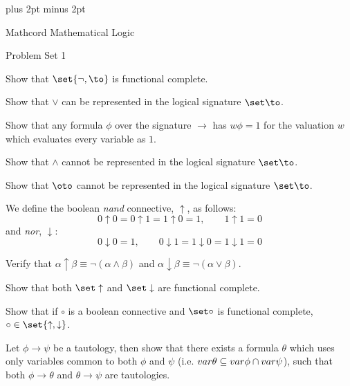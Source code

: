 

\parindent=0pt
\parskip=3pt plus 2pt minus 2pt



\centerline{Mathcord Mathematical Logic}
\centerline{Problem Set 1}

\bprob

    \benum
        \item Show that $\set{\neg,\to}$ is functional complete.
        \item Show that $\lor$ can be represented in the logical signature $\set\to$.
        \item Show that any formula $\phi$ over the signature $\to$ has $w\phi=1$ for the
        valuation $w$ which evaluates every variable as $1$.
        \item Show that $\land$ cannot be represented in the logical signature $\set\to$.
        \item Show that $\oto$ cannot be represented in the logical signature $\set\to$.
    \eenum

\eprob

\bprob

    We define the boolean {\it nand} connective, $\uparrow$, as follows:
    $$ 0\uparrow0 = 0\uparrow1 = 1\uparrow0 = 1,\qquad 1\uparrow1 = 0 $$
    and {\it nor}, $\downarrow$:
    $$ 0\downarrow0 = 1,\qquad 0\downarrow1 = 1\downarrow0 = 1\downarrow1 = 0 $$
    \benum
        \item Verify that $\alpha\uparrow\beta\equiv\neg(\alpha\land\beta)$ and
        $\alpha\downarrow\beta\equiv\neg(\alpha\lor\beta)$.
        \item Show that both $\set\uparrow$ and $\set\downarrow$ are functional complete.
        \item Show that if $\circ$ is a boolean connective and $\set\circ$ is functional
        complete, $\circ\in\set{\uparrow,\downarrow}$.
    \eenum

\eprob

\bprob

    Let $\phi\to\psi$ be a tautology, then show that there exists a formula $\theta$ which uses
    only variables common to both $\phi$ and $\psi$ (i.e.
    ${\sl var}\theta\subseteq{\sl var}\phi\cap{\sl var}\psi$), such that both $\phi\to\theta$ and $\theta\to\psi$
    are tautologies.

\eprob

\bprob

